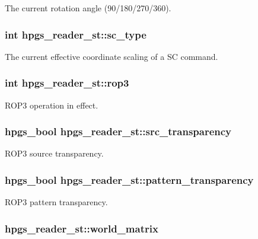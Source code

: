 The current rotation angle (90/180/270/360). 
\subsubsection[sc\_\-type]{\setlength{\rightskip}{0pt plus 5cm}int {\bf hpgs\_\-reader\_\-st::sc\_\-type}}\label{structhpgs__reader__st_9965b2804ef11e60242cd42044fb815e}


The current effective coordinate scaling of a SC command. 
\subsubsection[rop3]{\setlength{\rightskip}{0pt plus 5cm}int {\bf hpgs\_\-reader\_\-st::rop3}}\label{structhpgs__reader__st_3bdfe505341184cf0d69c7cde6d19d49}


ROP3 operation in effect. 
\subsubsection[src\_\-transparency]{\setlength{\rightskip}{0pt plus 5cm}hpgs\_\-bool {\bf hpgs\_\-reader\_\-st::src\_\-transparency}}\label{structhpgs__reader__st_adf25c6c84c8cd6a909f62c006ea8939}


ROP3 source transparency. 
\subsubsection[pattern\_\-transparency]{\setlength{\rightskip}{0pt plus 5cm}hpgs\_\-bool {\bf hpgs\_\-reader\_\-st::pattern\_\-transparency}}\label{structhpgs__reader__st_d303bb4fe1c896024fa1883cae6816f0}


ROP3 pattern transparency. 
\subsubsection[world\_\-matrix]{ {\bf hpgs\_\-reader\_\-st::world\_\-matrix}}\label{structhpgs__reader__st_2153ebf8e7d6bdc7a091dbe2a32b94ad}


